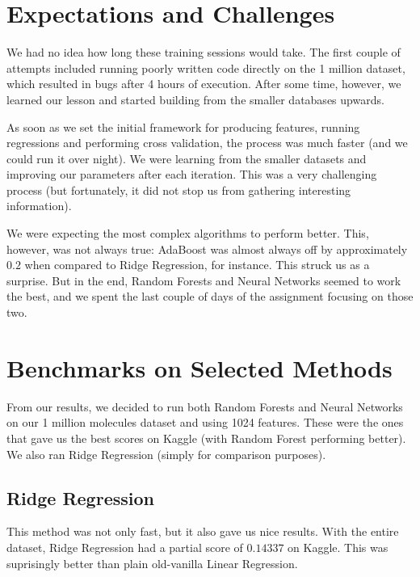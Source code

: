 \documentclass[10pt]{article}
\begin{document}
\section{Expectations and Challenges}

We had no idea how long these training sessions would take. The first couple of
attempts included running poorly written code directly on the 1 million dataset,
which resulted in bugs after 4 hours of execution. After some time, however,
we learned our lesson and started building from the smaller databases upwards.

\medskip

As soon as we set the initial framework for producing features, running regressions
and performing cross validation, the process was much faster (and we could run it
over night). We were learning from the smaller datasets and improving our parameters
after each iteration. This was a very challenging process (but fortunately, it did not stop
us from gathering interesting information).

\medskip

We were expecting the most complex algorithms to perform better. This, however,
was not always true: AdaBoost was almost always off by approximately $0.2$ when compared to
Ridge Regression, for instance. This struck us as a surprise. But in the end,
Random Forests and Neural Networks seemed to work the best, and we spent 
the last couple of days of the assignment focusing on those two.

\section{Benchmarks on Selected Methods}

From our results, we decided to run both Random Forests and Neural Networks on
our 1 million molecules dataset and using 1024 features. These were the ones that gave us the best
scores on Kaggle (with Random Forest performing better). We also ran
Ridge Regression (simply for comparison purposes).

\medskip

\subsection{Ridge Regression}

This method was not only fast, but it also gave us nice results. With the
entire dataset, Ridge Regression had a partial score of $0.14337$ on Kaggle.
This was suprisingly better than plain old-vanilla Linear Regression.
\end{document}
